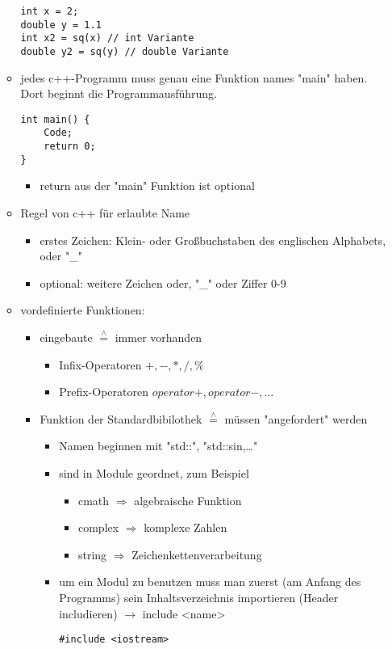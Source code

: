 \documentclass[a4paper]{scrartcl}
\newcommand{\estimates}{\overset{\scriptscriptstyle\wedge}{=}}%
\begin{document}
\begin{itemize}
\begin{itemize}
\begin{verbatim}
int x = 2;
double y = 1.1
int x2 = sq(x) // int Variante
double y2 = sq(y) // double Variante
\end{verbatim}
\item jedes c++-Programm muss genau eine Funktion names "main" haben. Dort beginnt die Programmausführung.
\begin{verbatim}
int main() {
	Code;
	return 0;
}
\end{verbatim}
\begin{itemize}
\item return aus der "main" Funktion ist optional
\end{itemize}
\item Regel von c++ für erlaubte Name
\begin{itemize}
\item erstes Zeichen: Klein- oder Großbuchstaben des englischen Alphabets, oder "\_"
\item optional: weitere Zeichen oder, "\_" oder Ziffer 0-9
\end{itemize}
\item vordefinierte Funktionen:
\begin{itemize}
\item eingebaute $\estimates$ immer vorhanden
\begin{itemize}
\item Infix-Operatoren $+,-,*,/,\%$
\item Prefix-Operatoren $operator+,operator-,\ldots$
\end{itemize}
\item Funktion der Standardbibilothek $\estimates$ müssen "angefordert" werden
\begin{itemize}
\item Namen beginnen mit "std::", "std::sin,\ldots{}"
\item sind in Module geordnet, zum Beispiel
\begin{itemize}
\item cmath $\Rightarrow$ algebraische Funktion
\item complex $\Rightarrow$ komplexe Zahlen
\item string $\Rightarrow$ Zeichenkettenverarbeitung
\end{itemize}
\item um ein Modul zu benutzen muss man zuerst (am Anfang des Programms) sein Inhaltsverzeichnis importieren (Header includieren) $\rightarrow$ include <name>
\begin{verbatim}
#include <iostream>

\end{verbatim}
\end{itemize}
\end{itemize}
\end{itemize}
\end{itemize}
\end{document}
